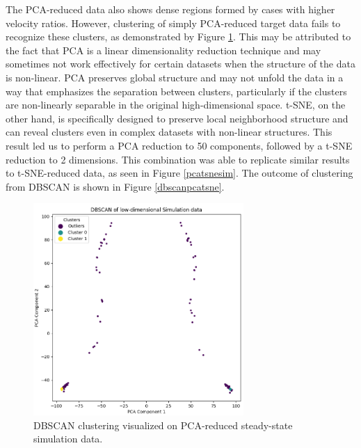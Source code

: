 The PCA-reduced data also shows dense regions formed by cases with higher velocity ratios. However, clustering of simply PCA-reduced target data fails to recognize these clusters, as demonstrated by Figure \ref{dbscanpca}. This may be attributed to the fact that PCA is a linear dimensionality reduction technique and may sometimes not work effectively for certain datasets when the structure of the data is non-linear. PCA preserves global structure and may not unfold the data in a way that emphasizes the separation between clusters, particularly if the clusters are non-linearly separable in the original high-dimensional space. t-SNE, on the other hand, is specifically designed to preserve local neighborhood structure and can reveal clusters even in complex datasets with non-linear structures. This result led us to perform a PCA reduction to 50 components, followed by a t-SNE reduction to 2 dimensions. This combination was able to replicate similar results to t-SNE-reduced data, as seen in Figure \ref{pcatsnesim}. The outcome of clustering from DBSCAN is shown in Figure \ref{dbscanpcatsne}. \\
\begin{figure}[ht]
    \centering
    \includegraphics[width=8cm]{images/Clustering/dbscan_pca_sim.png}
    \caption{DBSCAN clustering visualized on PCA-reduced steady-state simulation data.}
    \label{dbscanpca}
    \end{figure}
